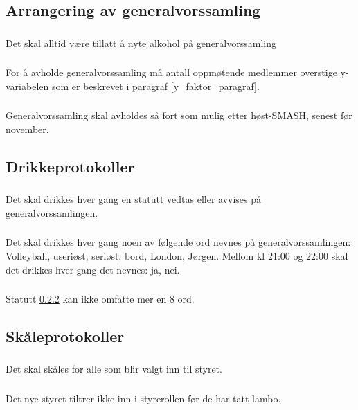 \documentclass{article}
\newenvironment{statute}[1][]
    {
        \titleformat{\subsubsection}[runin]{\normalfont}{\hspace{1pt}\textit{\S\hspace{5pt}\thesubsubsection}}{0pt}{\rule{4pt}{0pt}}{}
        \subsubsection{}#1
        \begin{minipage}[t]{0.9\linewidth}
    }
    {
        \end{minipage}
        
        \ignorespacesafterend
    }
\begin{document}
        \subsection{Arrangering av generalvorssamling}
            \begin{statute}
                Det skal alltid være tillatt å nyte alkohol på generalvorssamling
            \end{statute}
            \begin{statute} 
                For å avholde generalvorssamling må antall oppmøtende medlemmer overstige y-variabelen som er beskrevet i paragraf \ref{y_faktor_paragraf}.
            \end{statute}
            \begin{statute}
                Generalvorssamling skal avholdes så fort som mulig etter høst-SMASH, senest før november.
            \end{statute}
            
        \subsection{Drikkeprotokoller}
            \begin{statute}
                Det skal drikkes hver gang en statutt vedtas eller avvises på generalvorssamlingen.
            \end{statute}
            \begin{statute}[\label{drikkeprotokoll_forbudte_ord}]
                Det skal drikkes hver gang noen av følgende ord nevnes på generalvorssamlingen: Volleyball, useriøst, seriøst, bord, London, Jørgen. Mellom kl 21:00 og 22:00 skal det drikkes hver gang det nevnes: ja, nei.
            \end{statute}
        	\begin{statute}
        		Statutt \ref{drikkeprotokoll_forbudte_ord} kan ikke omfatte mer en 8 ord.
        	\end{statute}
            
        \subsection{Skåleprotokoller}
            \begin{statute}
                Det skal skåles for alle som blir valgt inn til styret.
            \end{statute}
            \begin{statute}
                Det nye styret tiltrer ikke inn i styrerollen før de har tatt lambo.
            \end{statute}            
\end{document}
